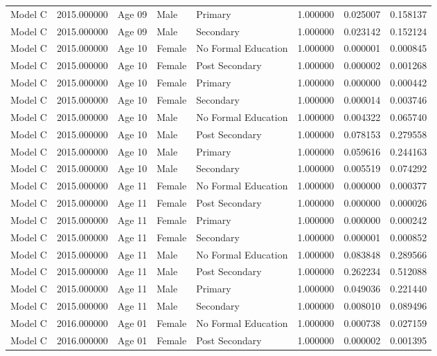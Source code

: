 \begin{table}[ht]
\begin{tabular}{lrlllrrr}
Model C & 2015.000000 & Age 09 & Male & Primary & 1.000000 & 0.025007 & 0.158137 \\
Model C & 2015.000000 & Age 09 & Male & Secondary & 1.000000 & 0.023142 & 0.152124 \\
Model C & 2015.000000 & Age 10 & Female & No Formal Education & 1.000000 & 0.000001 & 0.000845 \\
Model C & 2015.000000 & Age 10 & Female & Post Secondary & 1.000000 & 0.000002 & 0.001268 \\
Model C & 2015.000000 & Age 10 & Female & Primary & 1.000000 & 0.000000 & 0.000442 \\
Model C & 2015.000000 & Age 10 & Female & Secondary & 1.000000 & 0.000014 & 0.003746 \\
Model C & 2015.000000 & Age 10 & Male & No Formal Education & 1.000000 & 0.004322 & 0.065740 \\
Model C & 2015.000000 & Age 10 & Male & Post Secondary & 1.000000 & 0.078153 & 0.279558 \\
Model C & 2015.000000 & Age 10 & Male & Primary & 1.000000 & 0.059616 & 0.244163 \\
Model C & 2015.000000 & Age 10 & Male & Secondary & 1.000000 & 0.005519 & 0.074292 \\
Model C & 2015.000000 & Age 11 & Female & No Formal Education & 1.000000 & 0.000000 & 0.000377 \\
Model C & 2015.000000 & Age 11 & Female & Post Secondary & 1.000000 & 0.000000 & 0.000026 \\
Model C & 2015.000000 & Age 11 & Female & Primary & 1.000000 & 0.000000 & 0.000242 \\
Model C & 2015.000000 & Age 11 & Female & Secondary & 1.000000 & 0.000001 & 0.000852 \\
Model C & 2015.000000 & Age 11 & Male & No Formal Education & 1.000000 & 0.083848 & 0.289566 \\
Model C & 2015.000000 & Age 11 & Male & Post Secondary & 1.000000 & 0.262234 & 0.512088 \\
Model C & 2015.000000 & Age 11 & Male & Primary & 1.000000 & 0.049036 & 0.221440 \\
Model C & 2015.000000 & Age 11 & Male & Secondary & 1.000000 & 0.008010 & 0.089496 \\
Model C & 2016.000000 & Age 01 & Female & No Formal Education & 1.000000 & 0.000738 & 0.027159 \\
Model C & 2016.000000 & Age 01 & Female & Post Secondary & 1.000000 & 0.000002 & 0.001395 \\

\end{tabular}
\end{table}
